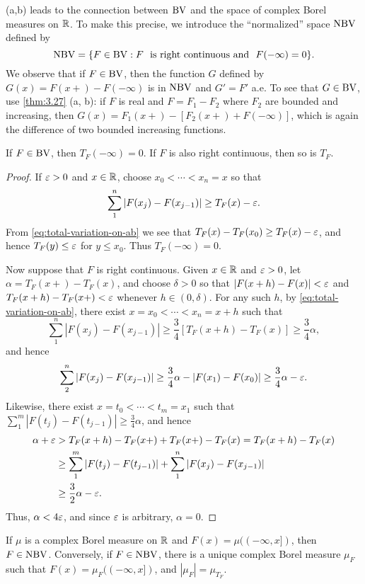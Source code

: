 \documentclass[12pt]{article} %
\begin{document}
 (a,b) leads to the connection between $\operatorname{BV}$ and the space of complex Borel measures on $\mathbb{R}$. To make this precise, we introduce the ``normalized'' space $\operatorname{NBV}$ defined by \[\NBV = \{F \in \BV : F \ \ \text{is right continuous and} \ \ F(-\infty) = 0\}.\] We observe that if $F \in \operatorname{BV}$, then the function $G$ defined by $G(x) = F(x+) - F(-\infty)$ is in $\operatorname{NBV}$ and $G' = F'$ a.e. To see that $G \in \operatorname{BV}$, use \cref{thm:3.27} (a, b): if $F$ is real and $F = F_1 - F_2$ where $F_2$ are bounded and increasing, then $G(x) = F_1(x+) - [F_2(x+) + F(-\infty)]$, which is again the difference of two bounded increasing functions. 

\begin{lemma}\label{lem:3.28}
    If $F \in \operatorname{BV}$, then $T_F(-\infty) = 0$. If $F$ is also right continuous, then so is $T_F$. 
\end{lemma}

\begin{proof}
    If $\varepsilon > 0$ and $x \in \mathbb{R}$, choose $x_0 < \cdots < x_n = x$ so that \[\sum_1^n |F(x_j) - F(x_{j-1})| \geq T_F(x) - \varepsilon.\] From \cref{eq:total-variation-on-ab} we see that $T_F(x) - T_F(x_0) \geq T_F(x) - \varepsilon$, and hence $T_F(y) \leq \varepsilon$ for $y \leq x_0$. Thus ${T_F(-\infty) = 0}$.

    Now suppose that $F$ is right continuous. Given $x \in \mathbb{R}$ and $\varepsilon > 0$, let $\alpha = T_F(x+) - T_F(x)$, and choose $\delta > 0$ so that $|F(x+h) - F(x)| < \varepsilon$ and $T_F(x + h) - T_F(x+) < \varepsilon$ whenever $h \in (0, \delta)$. For any such $h$, by \cref{eq:total-variation-on-ab}, there exist $x = x_0 < \cdots < x_n = x+h$ such that \[\sum_1^n |F(x_j) - F(x_{j-1})| \geq \frac{3}{4}[T_F(x + h) - T_F(x)] \geq \frac{3}{4}\alpha,\] and hence \[\sum_2^n |F(x_j) - F(x_{j-1})| \geq \frac{3}{4}\alpha - |F(x_1) - F(x_0)| \geq \frac{3}{4}\alpha - \varepsilon.\] Likewise, there exist $x = t_0 < \cdots < t_m = x_1$ such that $\sum_1^m |F(t_j) - F(t_{j-1})| \geq \frac{3}{4}\alpha$, and hence \begin{align*}
        \alpha + \varepsilon &> T_F(x + h) - T_F(x+) + T_F(x+) - T_F(x) = T_F(x + h) - T_F(x)\\
        &\geq \sum_1^m |F(t_j) - F(t_{j-1})| + \sum_1^n |F(x_j) - F(x_{j-1})|\\
        &\geq \frac{3}{2}\alpha - \varepsilon.
    \end{align*} Thus, $\alpha < 4\varepsilon$, and since $\varepsilon$ is arbitrary, $\alpha = 0$.
\end{proof}

\begin{theorem}\label{thm:3.29}
    If $\mu$ is a complex Borel measure on $\mathbb{R}$ and $F(x) = \mu((-\infty, x])$, then $F \in \operatorname{NBV}$. Conversely, if $F \in \operatorname{NBV}$, there is a unique complex Borel measure $\mu_F$ such that $F(x) = \mu_F((-\infty, x])$, and $|\mu_F| = \mu_{T_F}$.
\end{theorem}
\end{document}
